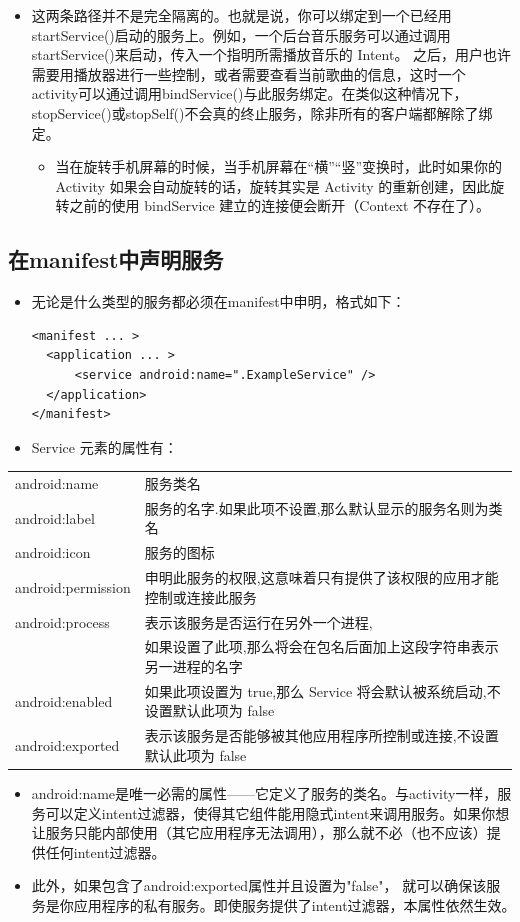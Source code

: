 \documentclass[9pt, b5paper]{article}
\begin{document}
\begin{itemize}
\begin{itemize}
\end{itemize}
\item 这两条路径并不是完全隔离的。也就是说，你可以绑定到一个已经用startService()启动的服务上。例如，一个后台音乐服务可以通过调用startService()来启动，传入一个指明所需播放音乐的 Intent。 之后，用户也许需要用播放器进行一些控制，或者需要查看当前歌曲的信息，这时一个activity可以通过调用bindService()与此服务绑定。在类似这种情况下，stopService()或stopSelf()不会真的终止服务，除非所有的客户端都解除了绑定。
\begin{itemize}
\item 当在旋转手机屏幕的时候，当手机屏幕在“横”“竖”变换时，此时如果你的 Activity 如果会自动旋转的话，旋转其实是 Activity 的重新创建，因此旋转之前的使用 bindService 建立的连接便会断开（Context 不存在了）。
\end{itemize}
\end{itemize}
\subsection{在manifest中声明服务}
\label{sec-3-5}
\begin{itemize}
\item 无论是什么类型的服务都必须在manifest中申明，格式如下：
\begin{verbatim}
<manifest ... >
  <application ... >
      <service android:name=".ExampleService" />
  </application>
</manifest>
\end{verbatim}
\item Service 元素的属性有：
\end{itemize}
\begin{center}
\begin{tabular}{ll}
\hline
android:name & 服务类名\\
android:label & 服务的名字.如果此项不设置,那么默认显示的服务名则为类名\\
android:icon & 服务的图标\\
android:permission & 申明此服务的权限,这意味着只有提供了该权限的应用才能控制或连接此服务\\
android:process & 表示该服务是否运行在另外一个进程,\\
 & 如果设置了此项,那么将会在包名后面加上这段字符串表示另一进程的名字\\
android:enabled & 如果此项设置为 true,那么 Service 将会默认被系统启动,不设置默认此项为 false\\
android:exported & 表示该服务是否能够被其他应用程序所控制或连接,不设置默认此项为 false　\\
\hline
\end{tabular}
\end{center}
\begin{itemize}
\item android:name是唯一必需的属性——它定义了服务的类名。与activity一样，服务可以定义intent过滤器，使得其它组件能用隐式intent来调用服务。如果你想让服务只能内部使用（其它应用程序无法调用），那么就不必（也不应该）提供任何intent过滤器。
\item 此外，如果包含了android:exported属性并且设置为"false"， 就可以确保该服务是你应用程序的私有服务。即使服务提供了intent过滤器，本属性依然生效。　
\end{itemize}
\end{document}
